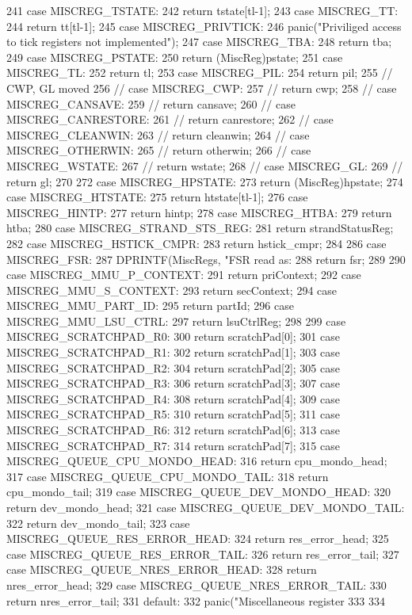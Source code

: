 \begin{DoxyCode}
{{241       case MISCREG_TSTATE:
242         return tstate[tl-1];
243       case MISCREG_TT:
244         return tt[tl-1];
245       case MISCREG_PRIVTICK:
246         panic("Priviliged access to tick registers not implemented\n");
247       case MISCREG_TBA:
248         return tba;
249       case MISCREG_PSTATE:
250         return (MiscReg)pstate;
251       case MISCREG_TL:
252         return tl;
253       case MISCREG_PIL:
254         return pil;
255       // CWP, GL moved
256       // case MISCREG_CWP:
257       //   return cwp;
258       // case MISCREG_CANSAVE:
259       //   return cansave;
260       // case MISCREG_CANRESTORE:
261       //   return canrestore;
262       // case MISCREG_CLEANWIN:
263       //   return cleanwin;
264       // case MISCREG_OTHERWIN:
265       //   return otherwin;
266       // case MISCREG_WSTATE:
267       //   return wstate;
268       // case MISCREG_GL:
269       //   return gl;
270 
272       case MISCREG_HPSTATE:
273         return (MiscReg)hpstate;
274       case MISCREG_HTSTATE:
275         return htstate[tl-1];
276       case MISCREG_HINTP:
277         return hintp;
278       case MISCREG_HTBA:
279         return htba;
280       case MISCREG_STRAND_STS_REG:
281         return strandStatusReg;
282       case MISCREG_HSTICK_CMPR:
283         return hstick_cmpr;
284 
286       case MISCREG_FSR:
287         DPRINTF(MiscRegs, "FSR read as: %
288         return fsr;
289 
290       case MISCREG_MMU_P_CONTEXT:
291         return priContext;
292       case MISCREG_MMU_S_CONTEXT:
293         return secContext;
294       case MISCREG_MMU_PART_ID:
295         return partId;
296       case MISCREG_MMU_LSU_CTRL:
297         return lsuCtrlReg;
298 
299       case MISCREG_SCRATCHPAD_R0:
300         return scratchPad[0];
301       case MISCREG_SCRATCHPAD_R1:
302         return scratchPad[1];
303       case MISCREG_SCRATCHPAD_R2:
304         return scratchPad[2];
305       case MISCREG_SCRATCHPAD_R3:
306         return scratchPad[3];
307       case MISCREG_SCRATCHPAD_R4:
308         return scratchPad[4];
309       case MISCREG_SCRATCHPAD_R5:
310         return scratchPad[5];
311       case MISCREG_SCRATCHPAD_R6:
312         return scratchPad[6];
313       case MISCREG_SCRATCHPAD_R7:
314         return scratchPad[7];
315       case MISCREG_QUEUE_CPU_MONDO_HEAD:
316         return cpu_mondo_head;
317       case MISCREG_QUEUE_CPU_MONDO_TAIL:
318         return cpu_mondo_tail;
319       case MISCREG_QUEUE_DEV_MONDO_HEAD:
320         return dev_mondo_head;
321       case MISCREG_QUEUE_DEV_MONDO_TAIL:
322         return dev_mondo_tail;
323       case MISCREG_QUEUE_RES_ERROR_HEAD:
324         return res_error_head;
325       case MISCREG_QUEUE_RES_ERROR_TAIL:
326         return res_error_tail;
327       case MISCREG_QUEUE_NRES_ERROR_HEAD:
328         return nres_error_head;
329       case MISCREG_QUEUE_NRES_ERROR_TAIL:
330         return nres_error_tail;
331       default:
332         panic("Miscellaneous register %
333     }
334 }
\end{DoxyCode}
